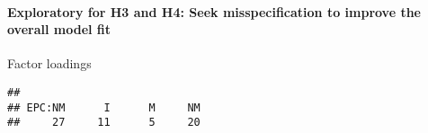 \documentclass[
]{article}
\newenvironment{Shaded}{\begin{snugshade}}{\end{snugshade}}
\newcommand{\CommentTok}[1]{\textcolor[rgb]{0.56,0.35,0.01}{\textit{#1}}}
\newcommand{\DataTypeTok}[1]{\textcolor[rgb]{0.13,0.29,0.53}{#1}}
\newcommand{\DecValTok}[1]{\textcolor[rgb]{0.00,0.00,0.81}{#1}}
\newcommand{\KeywordTok}[1]{\textcolor[rgb]{0.13,0.29,0.53}{\textbf{#1}}}
\newcommand{\NormalTok}[1]{#1}
\newcommand{\OperatorTok}[1]{\textcolor[rgb]{0.81,0.36,0.00}{\textbf{#1}}}
\newcommand{\StringTok}[1]{\textcolor[rgb]{0.31,0.60,0.02}{#1}}
\begin{document}
\hypertarget{exploratory-for-h3-and-h4-seek-misspecification-to-improve-the-overall-model-fit}{%
\paragraph{Exploratory for H3 and H4: Seek misspecification to improve
the overall model
fit}\label{exploratory-for-h3-and-h4-seek-misspecification-to-improve-the-overall-model-fit}}

Factor loadings

\begin{Shaded}
\end{Shaded}

\begin{verbatim}
## 
## EPC:NM      I      M     NM 
##     27     11      5     20
\end{verbatim}
\end{document}
